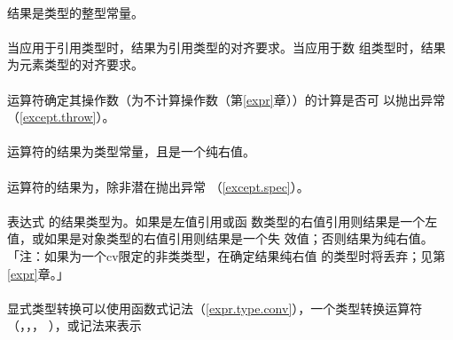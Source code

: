 \paragraph{}
结果是类型的整型常量。

\paragraph{}
当应用于引用类型时，结果为引用类型的对齐要求。当应用于数
组类型时，结果为元素类型的对齐要求。

\paragraph{}
运算符确定其操作数（为不计算操作数（第\ref{expr}章））的计算是否可
以抛出异常（\ref{except.throw}）。


\paragraph{}
运算符的结果为类型常量，且是一个纯右值。

\paragraph{}
运算符的结果为，除非潜在抛出异常
（\ref{except.spec}）。

\paragraph{}
表达式 的结果类型为。如果是左值引用或函
数类型的右值引用则结果是一个左值，或如果是对象类型的右值引用则结果是一个失
效值；否则结果为纯右值。「注：如果为一个cv限定的非类类型，在确定结果纯右值
的类型时将丢弃；见第\ref{expr}章。」

\paragraph{}
显式类型转换可以使用函数式记法（\ref{expr.type.conv}），一个类型转换运算符
（，，，
），或记法来表示

